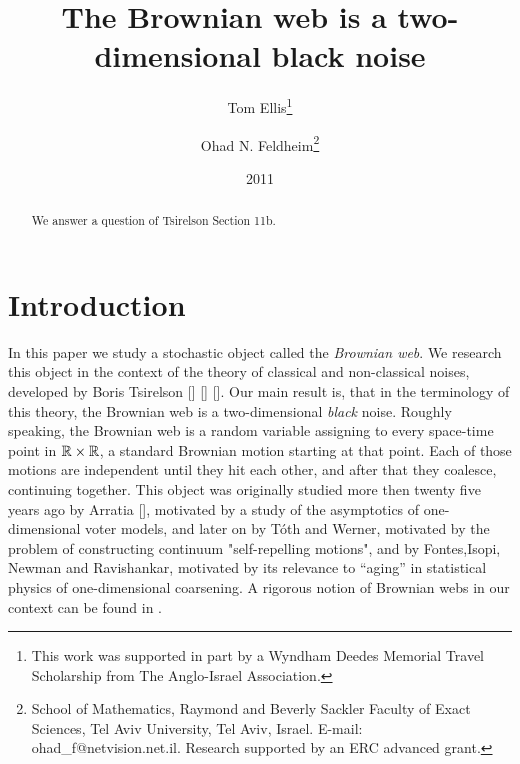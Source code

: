 {
\title{The Brownian web is a two-dimensional black noise}

\newcommand{\tomthanks}{This work was supported in part by
a Wyndham Deedes Memorial Travel Scholarship from The Anglo-Israel
Association.}

\newcommand{\ohadthanks}{School of Mathematics, Raymond and Beverly Sackler Faculty of Exact
Sciences, Tel Aviv University, Tel Aviv, Israel. E-mail:
ohad\_f@netvision.net.il. Research supported by an ERC advanced grant.}

\author{Tom Ellis\thanks{\tomthanks}\\%
\and Ohad N. Feldheim\thanks{\ohadthanks}}

\date{2011}

\maketitle

\begin{abstract}
We answer a question of
Tsirelson \cite{tsirelson-nonclassical-stochastic-flows} Section 11b.

\end{abstract}

\section{Introduction}
In this paper we study a stochastic object called the \emph{Brownian web}. We
research this object in the context of the theory of classical and
non-classical noises, developed by Boris Tsirelson [] [] []. Our main result
is, that in the terminology of this theory, the Brownian web is a
two-dimensional \emph{black} noise.
 Roughly speaking, the Brownian web is a random variable assigning to
every space-time point in $\mathbb{R}\times\mathbb{R}$, a standard Brownian motion starting
at that point. Each of those motions are independent until they hit each
other, and after that they coalesce, continuing together. This object was
originally studied more then twenty five years ago by Arratia [], motivated
by a study of the asymptotics of one-dimensional voter models, and later on
by T\'{o}th and Werner, motivated by the problem of constructing continuum
"self-repelling motions", and by Fontes,Isopi, Newman and Ravishankar,
motivated by its relevance to ``aging'' in statistical physics of
one-dimensional coarsening. A rigorous notion of Brownian webs in our context
can be found in .

}
